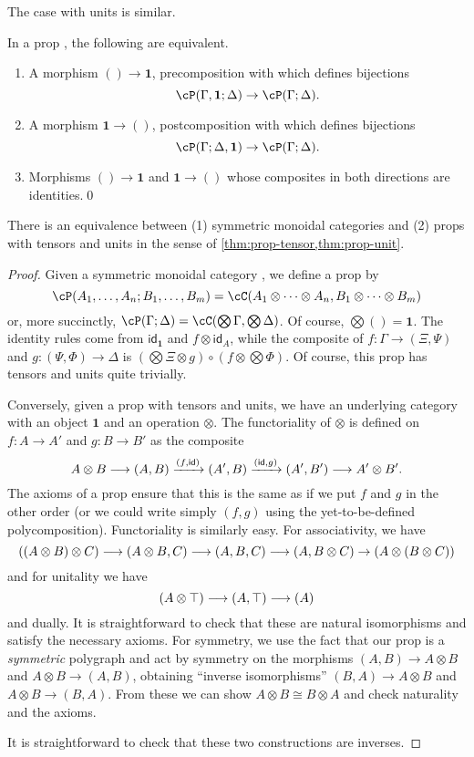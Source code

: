 \documentclass{book}
\def\idfunc{\mathsf{id}}
\def\unit{\top}%
\def\one{\mathbf{1}}
\let\tensor\otimes
\let\bigtensor\bigotimes
\begin{document}
The case with units is similar.

\begin{lem}\label{thm:prop-unit}
  In a prop \cP, the following are equivalent.
  \begin{enumerate}
  \item A morphism $()\to \one$, precomposition with which defines bijections
    \[\cP(\Gamma,\one;\Delta) \to \cP(\Gamma;\Delta).\]
  \item A morphism $\one\to()$, postcomposition with which defines bijections
    \[\cP(\Gamma;\Delta,\one) \to \cP(\Gamma;\Delta).\]
  \item Morphisms $()\to \one$ and $\one\to()$ whose composites in both directions are identities.\qed
  \end{enumerate}
\end{lem}

\begin{thm}\label{thm:prop-smc}
  There is an equivalence between (1) symmetric monoidal categories and (2) props with tensors and units in the sense of \cref{thm:prop-tensor,thm:prop-unit}.
\end{thm}
\begin{proof}
  Given a symmetric monoidal category \cC, we define a prop \cP by
  \[ \cP(A_1,\dots,A_n ; B_1,\dots,B_m) = \cC(A_1\tensor \cdots\tensor A_n, B_1\tensor\cdots\tensor B_m)\]
  or, more succinctly, $\cP(\Gamma;\Delta) = \cC(\bigtensor\Gamma, \bigtensor\Delta)$.
  Of course, $\bigtensor() = \one$.
  The identity rules come from $\idfunc_\one$ and $f\tensor \idfunc_A$, while the composite of $f:\Gamma\to (\Xi,\Psi)$ and $g:(\Psi,\Phi)\to \Delta$ is $(\bigtensor\Xi \tensor g) \circ (f\tensor \bigtensor \Phi)$.
  Of course, this prop has tensors and units quite trivially.

  Conversely, given a prop with tensors and units, we have an underlying category with an object $\one$ and an operation $\tensor$.
  The functoriality of $\tensor$ is defined on $f:A\to A'$ and $g:B\to B'$ as the composite
  \[ A\tensor B \too (A,B) \xto{(f,\idfunc)} (A',B) \xto{(\idfunc,g)} (A',B') \too A'\tensor B'. \]
  The axioms of a prop ensure that this is the same as if we put $f$ and $g$ in the other order (or we could write simply $(f,g)$ using the yet-to-be-defined polycomposition).
  Functoriality is similarly easy.
  For associativity, we have
  \[ ((A\tensor B)\tensor C) \too (A\tensor B,C) \too (A,B,C) \too (A,B\tensor C) \to (A\tensor (B\tensor C)) \]
  and for unitality we have
  \[ (A\tensor \unit) \too (A,\unit) \too (A) \]
  and dually.
  It is straightforward to check that these are natural isomorphisms and satisfy the necessary axioms.
  For symmetry, we use the fact that our prop is a \emph{symmetric} polygraph and act by symmetry on the morphisms $(A,B)\to A\tensor B$ and $A\tensor B\to (A,B)$, obtaining ``inverse isomorphisms'' $(B,A) \to A\tensor B$ and $A\tensor B \to (B,A)$.
  From these we can show $A\tensor B \cong B\tensor A$ and check naturality and the axioms.

  It is straightforward to check that these two constructions are inverses.
\end{proof}
\end{document}
